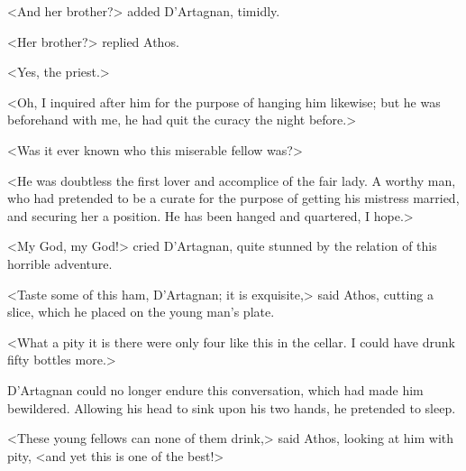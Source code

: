 <And her brother?> added D'Artagnan, timidly. 

<Her brother?> replied Athos. 

<Yes, the priest.> 

<Oh, I inquired after him for the purpose of hanging him likewise; but he was beforehand with me, he had quit the curacy the night before.> 

<Was it ever known who this miserable fellow was?> 

<He was doubtless the first lover and accomplice of the fair lady. A worthy man, who had pretended to be a curate for the purpose of getting his mistress married, and securing her a position. He has been hanged and quartered, I hope.> 

<My God, my God!> cried D'Artagnan, quite stunned by the relation of this horrible adventure. 

<Taste some of this ham, D'Artagnan; it is exquisite,> said Athos, cutting a slice, which he placed on the young man's plate. 

<What a pity it is there were only four like this in the cellar. I could have drunk fifty bottles more.> 

D'Artagnan could no longer endure this conversation, which had made him bewildered. Allowing his head to sink upon his two hands, he pretended to sleep. 

<These young fellows can none of them drink,> said Athos, looking at him with pity, <and yet this is one of the best!> 
